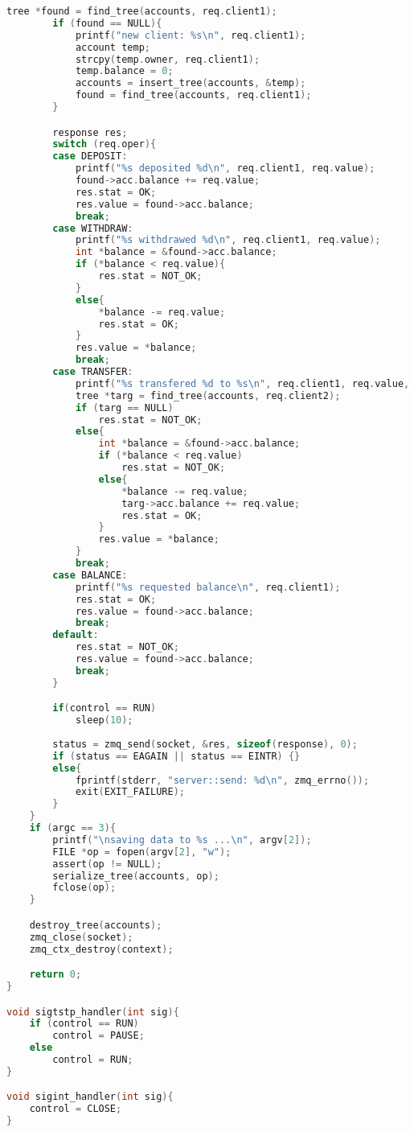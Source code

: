 \documentclass[12pt]{article}
\begin{document}
\begin{lstlisting}[language=C, basicstyle=\scriptsize]
        tree *found = find_tree(accounts, req.client1);
        if (found == NULL){
            printf("new client: %s\n", req.client1);
            account temp;
            strcpy(temp.owner, req.client1);
            temp.balance = 0;
            accounts = insert_tree(accounts, &temp);
            found = find_tree(accounts, req.client1);
        }

        response res;
        switch (req.oper){
        case DEPOSIT:
            printf("%s deposited %d\n", req.client1, req.value);
            found->acc.balance += req.value;
            res.stat = OK;
            res.value = found->acc.balance;
            break;
        case WITHDRAW:
            printf("%s withdrawed %d\n", req.client1, req.value);
            int *balance = &found->acc.balance;
            if (*balance < req.value){
                res.stat = NOT_OK;
            }
            else{
                *balance -= req.value;
                res.stat = OK;
            }
            res.value = *balance;
            break;
        case TRANSFER:
            printf("%s transfered %d to %s\n", req.client1, req.value, req.client2);
            tree *targ = find_tree(accounts, req.client2);
            if (targ == NULL)
                res.stat = NOT_OK;
            else{
                int *balance = &found->acc.balance;
                if (*balance < req.value)
                    res.stat = NOT_OK;
                else{
                    *balance -= req.value;
                    targ->acc.balance += req.value;
                    res.stat = OK;
                }
                res.value = *balance;
            }
            break;
        case BALANCE:
            printf("%s requested balance\n", req.client1);
            res.stat = OK;
            res.value = found->acc.balance;
            break;
        default:
            res.stat = NOT_OK;
            res.value = found->acc.balance;
            break;
        }

        if(control == RUN)
            sleep(10);
        
        status = zmq_send(socket, &res, sizeof(response), 0);
        if (status == EAGAIN || status == EINTR) {}
        else{
            fprintf(stderr, "server::send: %d\n", zmq_errno());
            exit(EXIT_FAILURE);
        }
    }
    if (argc == 3){
        printf("\nsaving data to %s ...\n", argv[2]);
        FILE *op = fopen(argv[2], "w");
        assert(op != NULL);
        serialize_tree(accounts, op);
        fclose(op);
    }

    destroy_tree(accounts);
    zmq_close(socket);
    zmq_ctx_destroy(context);

    return 0;
}

void sigtstp_handler(int sig){
    if (control == RUN)
        control = PAUSE;
    else
        control = RUN;
}

void sigint_handler(int sig){
    control = CLOSE;
}
\end{lstlisting}
\end{document}
